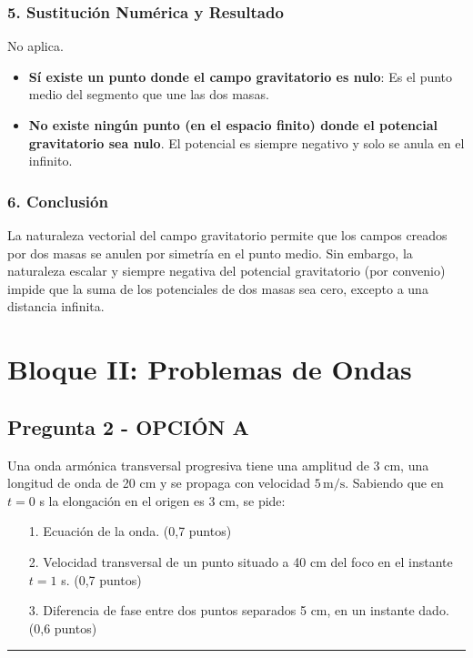 \subsubsection*{5. Sustitución Numérica y Resultado}
No aplica.
\begin{cajaresultado}
\begin{itemize}
    \item \textbf{Sí existe un punto donde el campo gravitatorio es nulo}: Es el punto medio del segmento que une las dos masas.
    \item \textbf{No existe ningún punto (en el espacio finito) donde el potencial gravitatorio sea nulo}. El potencial es siempre negativo y solo se anula en el infinito.
\end{itemize}
\end{cajaresultado}

\subsubsection*{6. Conclusión}
\begin{cajaconclusion}
La naturaleza vectorial del campo gravitatorio permite que los campos creados por dos masas se anulen por simetría en el punto medio. Sin embargo, la naturaleza escalar y siempre negativa del potencial gravitatorio (por convenio) impide que la suma de los potenciales de dos masas sea cero, excepto a una distancia infinita.
\end{cajaconclusion}

\newpage

\section{Bloque II: Problemas de Ondas}
\label{sec:ondas_2003_sep_ext}

\subsection{Pregunta 2 - OPCIÓN A}
\label{subsec:2A_2003_sep_ext}

\begin{cajaenunciado}
Una onda armónica transversal progresiva tiene una amplitud de 3 cm, una longitud de onda de 20 cm y se propaga con velocidad $5\,\text{m/s}$. Sabiendo que en $t=0$ s la elongación en el origen es 3 cm, se pide:
\begin{enumerate}
    \item[1.] Ecuación de la onda. (0,7 puntos)
    \item[2.] Velocidad transversal de un punto situado a 40 cm del foco en el instante $t=1$ s. (0,7 puntos)
    \item[3.] Diferencia de fase entre dos puntos separados 5 cm, en un instante dado. (0,6 puntos)
\end{enumerate}
\end{cajaenunciado}
\hrule

